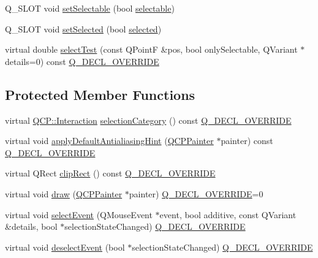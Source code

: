 \begin{DoxyCompactItemize}
Q\+\_\+\+S\+L\+OT void \mbox{\hyperlink{class_q_c_p_abstract_legend_item_a9913ef48730551b696e7f98a2391c599}{set\+Selectable}} (bool \mbox{\hyperlink{class_q_c_p_abstract_legend_item_af054a668038bcd7e35a35a07d1e79a23}{selectable}})
\item 
Q\+\_\+\+S\+L\+OT void \mbox{\hyperlink{class_q_c_p_abstract_legend_item_a6eed93b0ab99cb3eabb043fb08179c2b}{set\+Selected}} (bool \mbox{\hyperlink{class_q_c_p_abstract_legend_item_adf427dbb05d5f1a8e84c6abcb05becdf}{selected}})
\item 
virtual double \mbox{\hyperlink{class_q_c_p_abstract_legend_item_a80ec112a6608fc39dbed56239849b187}{select\+Test}} (const Q\+PointF \&pos, bool only\+Selectable, Q\+Variant $\ast$details=0) const \mbox{\hyperlink{qcustomplot_8h_a42cc5eaeb25b85f8b52d2a4b94c56f55}{Q\+\_\+\+D\+E\+C\+L\+\_\+\+O\+V\+E\+R\+R\+I\+DE}}
\end{DoxyCompactItemize}
\subsection*{Protected Member Functions}
\begin{DoxyCompactItemize}
\item 
virtual \mbox{\hyperlink{namespace_q_c_p_a2ad6bb6281c7c2d593d4277b44c2b037}{Q\+C\+P\+::\+Interaction}} \mbox{\hyperlink{class_q_c_p_abstract_legend_item_af8eb0fda0e11b0a23e1051b0102c8c6a}{selection\+Category}} () const \mbox{\hyperlink{qcustomplot_8h_a42cc5eaeb25b85f8b52d2a4b94c56f55}{Q\+\_\+\+D\+E\+C\+L\+\_\+\+O\+V\+E\+R\+R\+I\+DE}}
\item 
virtual void \mbox{\hyperlink{class_q_c_p_abstract_legend_item_a6bfbcb9ace779f4f6fe22241c32a67c9}{apply\+Default\+Antialiasing\+Hint}} (\mbox{\hyperlink{class_q_c_p_painter}{Q\+C\+P\+Painter}} $\ast$painter) const \mbox{\hyperlink{qcustomplot_8h_a42cc5eaeb25b85f8b52d2a4b94c56f55}{Q\+\_\+\+D\+E\+C\+L\+\_\+\+O\+V\+E\+R\+R\+I\+DE}}
\item 
virtual Q\+Rect \mbox{\hyperlink{class_q_c_p_abstract_legend_item_a806fa4d0104bdfc141aa8a36fcc9d51c}{clip\+Rect}} () const \mbox{\hyperlink{qcustomplot_8h_a42cc5eaeb25b85f8b52d2a4b94c56f55}{Q\+\_\+\+D\+E\+C\+L\+\_\+\+O\+V\+E\+R\+R\+I\+DE}}
\item 
virtual void \mbox{\hyperlink{class_q_c_p_abstract_legend_item_a14ce0b09f5b814c765a0d790bd838909}{draw}} (\mbox{\hyperlink{class_q_c_p_painter}{Q\+C\+P\+Painter}} $\ast$painter) \mbox{\hyperlink{qcustomplot_8h_a42cc5eaeb25b85f8b52d2a4b94c56f55}{Q\+\_\+\+D\+E\+C\+L\+\_\+\+O\+V\+E\+R\+R\+I\+DE}}=0
\item 
virtual void \mbox{\hyperlink{class_q_c_p_abstract_legend_item_a0081acfd8c4bb8ac4e9dcfe0f6c49b74}{select\+Event}} (Q\+Mouse\+Event $\ast$event, bool additive, const Q\+Variant \&details, bool $\ast$selection\+State\+Changed) \mbox{\hyperlink{qcustomplot_8h_a42cc5eaeb25b85f8b52d2a4b94c56f55}{Q\+\_\+\+D\+E\+C\+L\+\_\+\+O\+V\+E\+R\+R\+I\+DE}}
\item 
virtual void \mbox{\hyperlink{class_q_c_p_abstract_legend_item_aa1c0620558cc8e2a2e6fb7ab558f6097}{deselect\+Event}} (bool $\ast$selection\+State\+Changed) \mbox{\hyperlink{qcustomplot_8h_a42cc5eaeb25b85f8b52d2a4b94c56f55}{Q\+\_\+\+D\+E\+C\+L\+\_\+\+O\+V\+E\+R\+R\+I\+DE}}
\end{DoxyCompactItemize}
